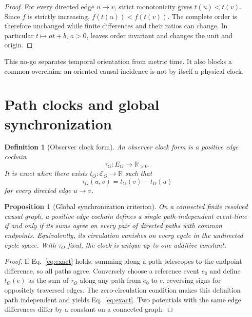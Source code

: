 \documentclass[11pt]{article}
\newtheorem{proposition}{Proposition}
\newtheorem{definition}{Definition}
\begin{document}
\begin{proof}
For every directed edge \(u\to v\), strict monotonicity gives
\(t(u)<t(v)\). Since \(f\) is strictly increasing,
\(f(t(u))<f(t(v))\). The complete order is therefore unchanged while finite
differences and their ratios can change. In particular
\(t\mapsto at+b\), \(a>0\), leaves order invariant and changes the unit and
origin.
\end{proof}

This no-go separates temporal orientation from metric time. It also blocks a
common overclaim: an oriented causal incidence is not by itself a physical
clock.

\section{Path clocks and global synchronization}

\begin{definition}[Observer clock form]
An observer clock form is a positive edge cochain
\begin{equation}
 \tau_O:E_O\longrightarrow\mathbb R_{>0}.
\end{equation}
It is exact when there exists \(t_O:\mathcal E_O\to\mathbb R\) such that
\begin{equation}
 \tau_O(u,v)=t_O(v)-t_O(u)
 \label{eq:exact}
\end{equation}
for every directed edge \(u\to v\).
\end{definition}

\begin{proposition}[Global synchronization criterion]
On a connected finite resolved causal graph, a positive edge cochain defines a
single path-independent event-time if and only if its sums agree on every pair of
directed paths with common endpoints. Equivalently, its circulation vanishes
on every cycle in the undirected cycle space. With \(\tau_O\) fixed, the clock
is unique up to one additive constant.
\end{proposition}

\begin{proof}
If Eq.~\eqref{eq:exact} holds, summing along a path telescopes to the endpoint
difference, so all paths agree. Conversely choose a reference event \(e_0\)
and define \(t_O(e)\) as the sum of \(\tau_O\) along any path from \(e_0\) to
\(e\), reversing signs for oppositely traversed edges. The zero-circulation
condition makes this definition path independent and yields
Eq.~\eqref{eq:exact}. Two potentials with the same edge differences differ by
a constant on a connected graph.
\end{proof}
\end{document}
